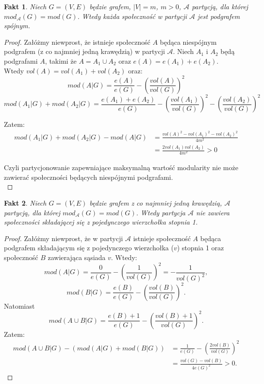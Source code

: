 \documentclass[letterpaper,12pt]{article}
\newtheorem{fact}{Fakt}
\begin{document}
  \begin{fact}
    Niech \(G = (V,E)\) będzie grafem, \(|V|=m\), \(m>0\), \(\mathcal{A}\) partycją, dla której \(mod_{\mathcal{A}}(G) = mod(G)\). Wtedy każda społeczność w partycji \(\mathcal{A}\) jest podgrafem spójnym.
  \end{fact}

  \begin{proof}
    Załóżmy niewprost, że istnieje społeczność \(A\) będąca niespójnym podgrafem (z co najmniej jedną krawędzią) w partycji \(\mathcal{A}\). Niech \(A_1\) i \(A_2\) będą podgrafami \(A\), takimi że \(A = A_1 \cup A_2\) oraz \(e(A) = e(A_1) + e(A_2)\).\\
    Wtedy \(vol(A) = vol(A_1) + vol(A_2)\) oraz:
    \[ mod(A|G) = \frac{e(A)}{e(G)} - {\left(\frac{vol(A)}{vol(G)}\right)}^2 \]
    \[ mod(A_1|G) + mod(A_2|G) = \frac{e(A_1)+e(A_2)}{e(G)} - {\left(\frac{vol(A_1)}{vol(G)}\right)}^2 - {\left(\frac{vol(A_2)}{vol(G)}\right)}^2 \]
    
    Zatem:
    \begin{align*}
      mod(A_1|G) + mod(A_2|G) - mod(A|G) 
      &= \frac{{vol(A)}^2 - {vol(A_1)}^2 - {vol(A_2)}^2}{4m^2} \\
      &= \frac{2vol(A_1)vol(A_2)}{4m^2} > 0
    \end{align*}

    Czyli partycjonowanie zapewniające maksymalną wartość modularity nie może zawierać społeczności będących niespójnymi podgrafami.\\
  \end{proof}

  \begin{fact}
    Niech \(G = (V,E)\) będzie grafem z co najmniej jedną krawędzią, \(\mathcal{A}\) partycją, dla której \(mod_{\mathcal{A}}(G) = mod(G)\). Wtedy partycja \(\mathcal{A}\) nie zawiera społeczności składającej się z pojedynczego wierzchołka stopnia 1.
  \end{fact}

  \begin{proof}
    Załóżmy niewprost, że w partycji \(\mathcal{A}\) istnieje społeczność \(A\) będąca podgrafem składającym się z pojedynczego wierzchołka (\(v\)) stopnia 1 oraz społeczność \(B\) zawierająca sąsiada \(v\). Wtedy:
    \[
      mod(A|G) = \frac{0}{e(G)} - {\left(\frac{1}{vol(G)}\right)}^2 = -\frac{1}{vol(G)^2},
    \]
    \[
      mod(B|G) = \frac{e(B)}{e(G)} - {\left(\frac{vol(B)}{vol(G)}\right)}^2.
    \]
    Natomiast
    \[
      mod(A \cup B|G) = \frac{e(B)+1}{e(G)} - {\left(\frac{vol(B)+1}{vol(G)}\right)}^2.
    \]
    Zatem:
    \begin{align*}
      mod(A \cup B|G) - \left(mod(A|G)+mod(B|G)\right)
      &= \frac{1}{e(G)} - \left(\frac{2vol(B)}{vol(G)}\right)^2 \\
      &= \frac{vol(G)-vol(B)}{4e(G)^2} > 0.
    \end{align*}
  \end{proof}
\end{document}
